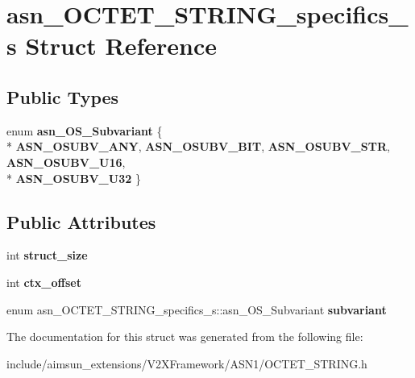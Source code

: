 \hypertarget{structasn__OCTET__STRING__specifics__s}{}\section{asn\+\_\+\+O\+C\+T\+E\+T\+\_\+\+S\+T\+R\+I\+N\+G\+\_\+specifics\+\_\+s Struct Reference}
\label{structasn__OCTET__STRING__specifics__s}
\subsection*{Public Types}
\begin{DoxyCompactItemize}
\item 
enum {\bfseries asn\+\_\+\+O\+S\+\_\+\+Subvariant} \{ \\*
{\bfseries A\+S\+N\+\_\+\+O\+S\+U\+B\+V\+\_\+\+A\+NY}, 
{\bfseries A\+S\+N\+\_\+\+O\+S\+U\+B\+V\+\_\+\+B\+IT}, 
{\bfseries A\+S\+N\+\_\+\+O\+S\+U\+B\+V\+\_\+\+S\+TR}, 
{\bfseries A\+S\+N\+\_\+\+O\+S\+U\+B\+V\+\_\+\+U16}, 
\\*
{\bfseries A\+S\+N\+\_\+\+O\+S\+U\+B\+V\+\_\+\+U32}
 \}\hypertarget{structasn__OCTET__STRING__specifics__s_a4d3a388a74be4081014f98b6a8a50dd4}{}\label{structasn__OCTET__STRING__specifics__s_a4d3a388a74be4081014f98b6a8a50dd4}

\end{DoxyCompactItemize}
\subsection*{Public Attributes}
\begin{DoxyCompactItemize}
\item 
int {\bfseries struct\+\_\+size}\hypertarget{structasn__OCTET__STRING__specifics__s_a9fe9245c75c076dd503365b33ebddf2d}{}\label{structasn__OCTET__STRING__specifics__s_a9fe9245c75c076dd503365b33ebddf2d}

\item 
int {\bfseries ctx\+\_\+offset}\hypertarget{structasn__OCTET__STRING__specifics__s_a6cf8d330b29cde73baf531c0e42b35ec}{}\label{structasn__OCTET__STRING__specifics__s_a6cf8d330b29cde73baf531c0e42b35ec}

\item 
enum asn\+\_\+\+O\+C\+T\+E\+T\+\_\+\+S\+T\+R\+I\+N\+G\+\_\+specifics\+\_\+s\+::asn\+\_\+\+O\+S\+\_\+\+Subvariant {\bfseries subvariant}\hypertarget{structasn__OCTET__STRING__specifics__s_a7aea52fb2a5970a9adaaaf404cbba224}{}\label{structasn__OCTET__STRING__specifics__s_a7aea52fb2a5970a9adaaaf404cbba224}

\end{DoxyCompactItemize}


The documentation for this struct was generated from the following file\+:\begin{DoxyCompactItemize}
\item 
include/aimsun\+\_\+extensions/\+V2\+X\+Framework/\+A\+S\+N1/O\+C\+T\+E\+T\+\_\+\+S\+T\+R\+I\+N\+G.\+h\end{DoxyCompactItemize}
